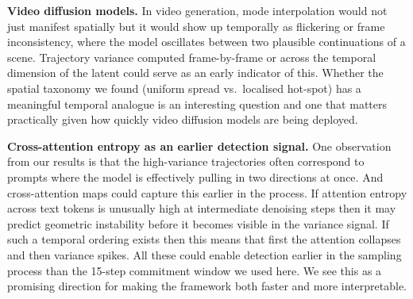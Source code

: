 \documentclass[conference]{IEEEtran}
\begin{document}
\textbf{Video diffusion models.}
In video generation, mode interpolation would not just manifest
spatially but it would show up temporally as flickering or frame
inconsistency, where the model oscillates between two plausible
continuations of a scene. Trajectory variance computed
frame-by-frame or across the temporal dimension of the latent
could serve as an early indicator of this. Whether the spatial
taxonomy we found (uniform spread vs.\ localised hot-spot) has a
meaningful temporal analogue is an interesting question and one
that matters practically given how quickly video diffusion models
are being deployed.

\textbf{Cross-attention entropy as an earlier detection signal.}
One observation from our results is that the high-variance trajectories
often correspond to prompts where the model is effectively pulling
in two directions at once. And cross-attention maps could capture this
earlier in the process. If attention entropy across text tokens is
unusually high at intermediate denoising steps then it may predict
geometric instability before it becomes visible in the variance
signal. If such a temporal ordering exists then this means that first the attention collapses and then variance spikes. All these could enable detection earlier
in the sampling process than the 15-step commitment window we used
here. We see this as a promising direction for making the framework
both faster and more interpretable.


\end{document}
